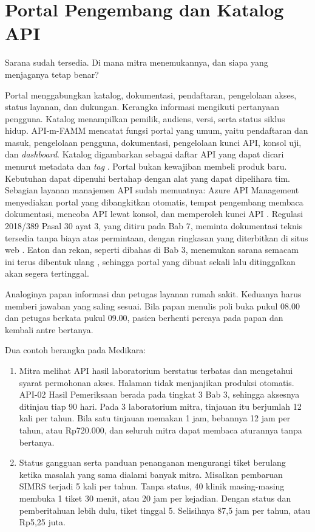 \section{Portal Pengembang dan Katalog API}

Sarana sudah tersedia. Di mana mitra menemukannya, dan siapa yang menjaganya tetap benar?

Portal menggabungkan katalog, dokumentasi, pendaftaran, pengelolaan akses, status layanan, dan dukungan. Kerangka informasi
mengikuti pertanyaan pengguna. Katalog menampilkan pemilik, audiens, versi, serta status siklus hidup. API-m-FAMM mencatat
fungsi portal yang umum, yaitu pendaftaran dan masuk, pengelolaan pengguna, dokumentasi, pengelolaan kunci API, konsol uji,
dan \textit{dashboard}. Katalog digambarkan sebagai daftar API yang dapat dicari menurut metadata dan \textit{tag}
\cite{mathijssen2020}. Portal bukan kewajiban membeli produk baru. Kebutuhan dapat dipenuhi bertahap dengan alat yang
dapat dipelihara tim. Sebagian layanan manajemen API sudah memuatnya: Azure API Management menyediakan portal yang
dibangkitkan otomatis, tempat pengembang membaca dokumentasi, mencoba API lewat konsol, dan memperoleh kunci API
\cite{azure-apim}. Regulasi 2018/389 Pasal 30 ayat 3, yang ditiru pada Bab 7, meminta dokumentasi teknis tersedia tanpa
biaya atas permintaan, dengan ringkasan yang diterbitkan di situs web \cite{rts2018}. Eaton dan rekan, seperti dibahas di
Bab 3, menemukan sarana semacam ini terus dibentuk ulang \cite{eaton2015distributed}, sehingga portal yang dibuat sekali
lalu ditinggalkan akan segera tertinggal.

Analoginya papan informasi dan petugas layanan rumah sakit. Keduanya harus memberi jawaban yang saling sesuai. Bila papan
menulis poli buka pukul 08.00 dan petugas berkata pukul 09.00, pasien berhenti percaya pada papan dan kembali antre bertanya.

Dua contoh berangka pada Medikara:
\begin{enumerate}
  \item Mitra melihat API hasil laboratorium berstatus terbatas dan mengetahui syarat permohonan akses. Halaman tidak
        menjanjikan produksi otomatis. API-02 Hasil Pemeriksaan berada pada tingkat 3 Bab 3, sehingga aksesnya ditinjau tiap
        90 hari. Pada 3 laboratorium mitra, tinjauan itu berjumlah 12 kali per tahun. Bila satu tinjauan memakan 1 jam,
        bebannya 12 jam per tahun, atau Rp720.000, dan seluruh mitra dapat membaca aturannya tanpa bertanya.
  \item Status gangguan serta panduan penanganan mengurangi tiket berulang ketika masalah yang sama dialami banyak mitra.
        Misalkan pembaruan SIMRS terjadi 5 kali per tahun. Tanpa status, 40 klinik masing-masing membuka 1 tiket 30 menit,
        atau 20 jam per kejadian. Dengan status dan pemberitahuan lebih dulu, tiket tinggal 5. Selisihnya 87,5 jam per tahun,
        atau Rp5,25 juta.
\end{enumerate}

